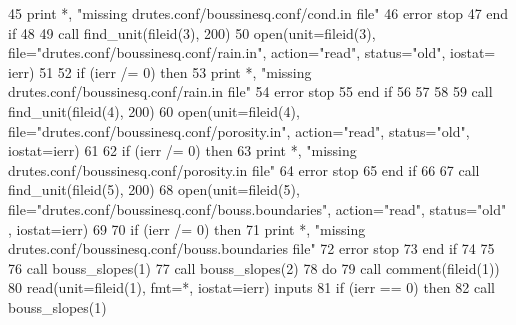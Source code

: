 \begin{DoxyCode}
45         print *, \textcolor{stringliteral}{"missing drutes.conf/boussinesq.conf/cond.in file"}
46         error stop
47 \textcolor{keywordflow}{      end if}
48       
49       \textcolor{keyword}{call }find_unit(fileid(3), 200)
50       \textcolor{keyword}{open}(unit=fileid(3), file=\textcolor{stringliteral}{"drutes.conf/boussinesq.conf/rain.in"}, action\textcolor{comment}{=}\textcolor{stringliteral}{"read"}\textcolor{comment}{, status=}\textcolor{stringliteral}{"old"}\textcolor{comment}{, iostat=
      ierr)}
51 \textcolor{comment}{      }
52 \textcolor{comment}{      }\textcolor{keywordflow}{if} (ierr /= 0) \textcolor{keywordflow}{then}
53         print *, \textcolor{stringliteral}{"missing drutes.conf/boussinesq.conf/rain.in file"}
54         error stop
55 \textcolor{keywordflow}{      end if}
56       
57       
58       
59       \textcolor{keyword}{call }find_unit(fileid(4), 200)
60       \textcolor{keyword}{open}(unit=fileid(4), file=\textcolor{stringliteral}{"drutes.conf/boussinesq.conf/porosity.in"}\textcolor{comment}{, action=}\textcolor{stringliteral}{"read"}\textcolor{comment}{, status=}\textcolor{stringliteral}{"old"}\textcolor{comment}{, 
      iostat=ierr)}
61 \textcolor{comment}{      }
62 \textcolor{comment}{      }\textcolor{keywordflow}{if} (ierr /= 0) \textcolor{keywordflow}{then}
63         print *, \textcolor{stringliteral}{"missing drutes.conf/boussinesq.conf/porosity.in file"}
64         error stop
65 \textcolor{keywordflow}{      end if}
66       
67       \textcolor{keyword}{call }find_unit(fileid(5), 200)
68       \textcolor{keyword}{open}(unit=fileid(5), file=\textcolor{stringliteral}{"drutes.conf/boussinesq.conf/bouss.boundaries"}\textcolor{comment}{, action=}\textcolor{stringliteral}{"read"}\textcolor{comment}{, status=}\textcolor{stringliteral}{"old"}\textcolor{comment}{
      , iostat=ierr)}
69 \textcolor{comment}{      }
70 \textcolor{comment}{      }\textcolor{keywordflow}{if} (ierr /= 0) \textcolor{keywordflow}{then}
71         print *, \textcolor{stringliteral}{"missing drutes.conf/boussinesq.conf/bouss.boundaries file"}
72         error stop
73 \textcolor{keywordflow}{      end if}
74       
75       
76       \textcolor{keyword}{call }bouss_slopes(1)%
77       \textcolor{keyword}{call }bouss_slopes(2)%
78       \textcolor{keywordflow}{do} 
79         \textcolor{keyword}{call }comment(fileid(1))
80         \textcolor{keyword}{read}(unit=fileid(1), fmt=*, iostat=ierr) inputs
81         \textcolor{keywordflow}{if} (ierr == 0) \textcolor{keywordflow}{then}
82           \textcolor{keyword}{call }bouss_slopes(1)%

\end{DoxyCode}
